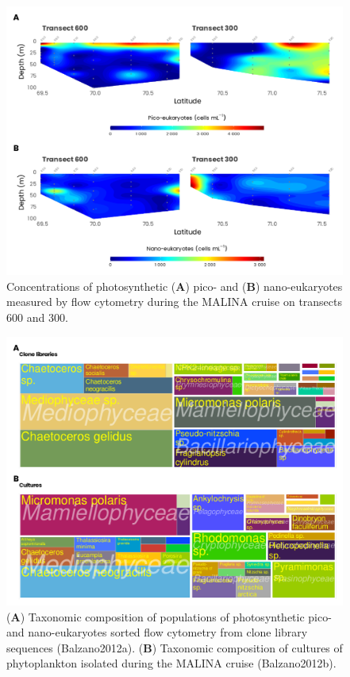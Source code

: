 \documentclass[essd, manuscript]{copernicus}
\begin{document}
\clearpage

\begin{figure}[H]
	\centering
	\includegraphics[scale = 1]{../../../graphs/fig10.pdf}
	\caption{Concentrations of photosynthetic (\textbf{A}) pico- and (\textbf{B}) nano-eukaryotes measured by flow cytometry during the MALINA cruise on transects 600 and 300.}
\end{figure}

\clearpage

\begin{figure}[H]
	\centering
	\includegraphics[scale = 1]{../../../graphs/fig11.pdf}
	\caption{(\textbf{A}) Taxonomic composition of populations of photosynthetic pico- and nano-eukaryotes sorted flow cytometry from clone library sequences  (Balzano2012a). (\textbf{B}) Taxonomic composition of cultures of phytoplankton isolated during the MALINA cruise  (Balzano2012b).}
\end{figure}
\end{document}
